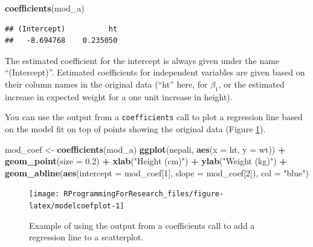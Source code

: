 \documentclass[]{book}
\makeatletter
\newenvironment{Shaded}{\begin{snugshade}}{\end{snugshade}}
\newcommand{\KeywordTok}[1]{\textcolor[rgb]{0.13,0.29,0.53}{\textbf{#1}}}
\newcommand{\DataTypeTok}[1]{\textcolor[rgb]{0.13,0.29,0.53}{#1}}
\newcommand{\DecValTok}[1]{\textcolor[rgb]{0.00,0.00,0.81}{#1}}
\newcommand{\FloatTok}[1]{\textcolor[rgb]{0.00,0.00,0.81}{#1}}
\newcommand{\StringTok}[1]{\textcolor[rgb]{0.31,0.60,0.02}{#1}}
\newcommand{\OperatorTok}[1]{\textcolor[rgb]{0.81,0.36,0.00}{\textbf{#1}}}
\newcommand{\NormalTok}[1]{#1}
\newenvironment{kframe}{%
\medskip{}
\setlength{\fboxsep}{.8em}
 \def\at@end@of@kframe{}%
 \ifinner\ifhmode%
  \def\at@end@of@kframe{\end{minipage}}%
  \begin{minipage}{\columnwidth}%
 \fi\fi%
 \def\FrameCommand##1{\hskip\@totalleftmargin \hskip-\fboxsep
 \colorbox{shadecolor}{##1}\hskip-\fboxsep
     \hskip-\linewidth \hskip-\@totalleftmargin \hskip\columnwidth}%
 \MakeFramed {\advance\hsize-\width
   \@totalleftmargin\z@ \linewidth\hsize
   \@setminipage}}%
 {\par\unskip\endMakeFramed%
 \at@end@of@kframe}
\renewenvironment{Shaded}{\begin{kframe}}{\end{kframe}}
\theoremstyle{definition}
\theoremstyle{definition}
\theoremstyle{definition}
\theoremstyle{remark}
\makeatother
\begin{document}
\begin{Shaded}
\begin{Highlighting}[]
\KeywordTok{coefficients}\NormalTok{(mod_a)}
\end{Highlighting}
\end{Shaded}

\begin{verbatim}
## (Intercept)          ht 
##   -8.694768    0.235050
\end{verbatim}

The estimated coefficient for the intercept is always given under the
name ``(Intercept)''. Estimated coefficients for independent variables
are given based on their column names in the original data (``ht'' here,
for \(\beta_1\), or the estimated increase in expected weight for a one
unit increase in height).

You can use the output from a \texttt{coefficients} call to plot a
regression line based on the model fit on top of points showing the
original data (Figure \ref{fig:modelcoefplot}).

\begin{Shaded}
\begin{Highlighting}[]
\NormalTok{mod_coef <-}\StringTok{ }\KeywordTok{coefficients}\NormalTok{(mod_a)}
\KeywordTok{ggplot}\NormalTok{(nepali, }\KeywordTok{aes}\NormalTok{(}\DataTypeTok{x =}\NormalTok{ ht, }\DataTypeTok{y =}\NormalTok{ wt)) }\OperatorTok{+}\StringTok{ }
\StringTok{  }\KeywordTok{geom_point}\NormalTok{(}\DataTypeTok{size =} \FloatTok{0.2}\NormalTok{) }\OperatorTok{+}\StringTok{ }
\StringTok{  }\KeywordTok{xlab}\NormalTok{(}\StringTok{"Height (cm)"}\NormalTok{) }\OperatorTok{+}\StringTok{ }\KeywordTok{ylab}\NormalTok{(}\StringTok{"Weight (kg)"}\NormalTok{) }\OperatorTok{+}\StringTok{ }
\StringTok{  }\KeywordTok{geom_abline}\NormalTok{(}\KeywordTok{aes}\NormalTok{(}\DataTypeTok{intercept =}\NormalTok{ mod_coef[}\DecValTok{1}\NormalTok{],}
                  \DataTypeTok{slope =}\NormalTok{ mod_coef[}\DecValTok{2}\NormalTok{]), }\DataTypeTok{col =} \StringTok{"blue"}\NormalTok{)}
\end{Highlighting}
\end{Shaded}

\begin{figure}

{\centering \texttt{[image: RProgrammingForResearch\_files/figure-latex/modelcoefplot-1]} 

}

\caption{Example of using the output from a coefficients call to add a regression line to a scatterplot.}\label{fig:modelcoefplot}
\end{figure}
\end{document}
